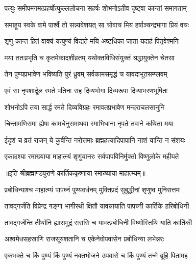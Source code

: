 \twolineshloka
{पत्युः समीपमगमत्प्रहर्षोत्फुल्ललोचना}
{सहर्षः शोभनोऽतीव दृष्ट्वा कान्तां समागताम्} %

\twolineshloka
{समाहूय स्वके वामे पार्श्वे तो सन्न्यवेशयत्}
{सा चोवाच मिय हर्षाञ्चन्द्रभागा प्रियं वचः} %

\twolineshloka
{शृणु कान्त हितं वाक्यं यत्पुण्यं विद्यते मयि}
{अष्टधिका जाता यदाहं पितृवेश्मनि} %

\twolineshloka
{मया ततःप्रभृति च कृतमेकादशीव्रतम्}
{यथोक्तविधिसंयुक्तं श्रद्धायुक्तेन चेतसा} %

\twolineshloka
{तेन पुण्यप्रभावेण भविष्यति पुरं ध्रुवम्}
{सर्वकामसमृद्धं च यावदाभूतसम्प्लवम्} %

\twolineshloka
{एवं सा नृपशार्दूल रमते पतिना सह}
{दिव्यभोगा दिव्यरूपा दिव्याभरणभूषिता} %

\twolineshloka
{शोभनोऽपि तया सार्द्ध रमते दिव्यविग्रहः}
{रमावतप्रभावेण मन्दराचलसानुनि} %

\twolineshloka
{चिन्तामणिसमा ह्येषा कामधेनुसमाथवा}
{रमाभिधाना नृपते तवाने कथिता मया} %

\twolineshloka
{ईदृशं च व्रतं राजन् ये कुर्वन्ति नरोत्तमाः}
{ब्रह्महत्यादिपापानि नाशं यान्ति न संशयः} %

\twolineshloka
{एकादश्या रमाख्याया माहात्म्यं शृणुयानरः}
{सर्वपापविनिर्मुक्तो विष्णुलोके महीयते} %

॥इति श्रीब्रह्माण्डपुराणे कार्तिककृष्णाया रमाख्याया माहात्म्यम्॥


\hyperref[sec:ekadashi_mahatmyam_vrata_raja]{\closesub}
\clearpage

\label{sec:vrata-raja-karttika-shukla-prabodhini}


\twolineshloka
{प्रबोधिन्याश्च माहात्म्यं पापघ्नं पुण्यवर्धनम्}
{मुक्तिप्रदं सुबुद्धीनां शृणुष्व मुनिसत्तम} %

\twolineshloka
{तावद्गर्जति विप्रेन्द्र गङ्गा भागीरथी क्षितौ}
{यावन्नायाति पापघ्नी कार्तिके हरिबोधिनी} %

\twolineshloka
{तावद्गर्जन्ति तीर्थानि ह्यासमुद्रं सरांसि च}
{यावत्प्रबोधिनी विष्णोस्तिथि याति कार्तिकी} %

\twolineshloka
{अश्वमेधसहस्राणि राजसूयशतानि च}
{एकेनेवोपवासेन प्रबोधिन्या लभेन्नरः} %


\twolineshloka
{एकभक्ते च किं पुण्यं किं पुण्यं नक्तभोजने}
{उपवासे च किं पुण्यं तन्मे ब्रूहि पितामह} %

